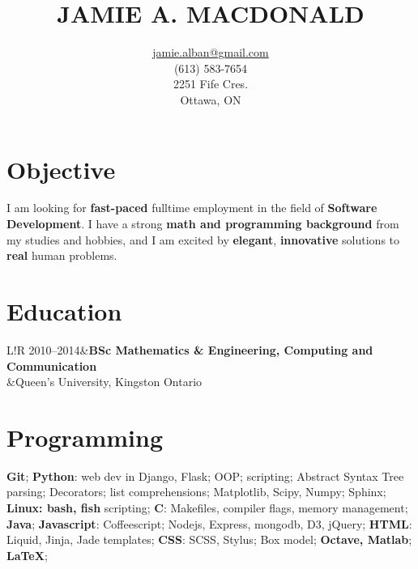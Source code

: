\documentclass[10pt]{article}
\title{JAMIE A. MACDONALD}
\author{\href{mailto:jamie.alban@gmail.com}{jamie.alban@gmail.com}\\(613) 583-7654\\2251 Fife Cres.\\Ottawa, ON}
\date{}
\newcommand\VRule{\color{lightgray}\vrule width 0.5pt}
\begin{document}
\begin{minipage}{0.2\textwidth}
\hspace{0em}
\end{minipage}
\begin{minipage}{0.55\textwidth}
\vspace{-3em}
\maketitle
\end{minipage}
\begin{minipage}{0.25\textwidth}
\end{minipage}
\thispagestyle{fancy}
\vspace{-3em}
\section*{Objective}
I am looking for \textbf{fast-paced} fulltime employment in the field of \textbf{Software Development}. I have a strong \textbf{math and programming background} from my studies and hobbies, and I am excited by \textbf{elegant}, \textbf{innovative} solutions to \textbf{real} human problems.
\vspace{-1em}
\section*{Education}
\begin{tabular}{L!{\VRule}R}
2010--2014&{\bf BSc Mathematics \& Engineering, Computing and Communication}\\
          &{Queen's University, Kingston Ontario}\\
\end{tabular}
\vspace{-1em}
\section*{Programming}
\textbf{Git}; \textbf{Python}: web dev in Django, Flask; OOP; scripting; Abstract Syntax Tree parsing; Decorators; list comprehensions; Matplotlib, Scipy, Numpy; Sphinx; \textbf{Linux: bash, fish} scripting; \textbf{C}: Makefiles, compiler flags, memory management; \textbf{Java}; \textbf{Javascript}: Coffeescript; Nodejs, Express, mongodb, D3, jQuery; \textbf{HTML}: Liquid, Jinja, Jade templates; \textbf{CSS}: SCSS, Stylus; Box model; \textbf{Octave, Matlab}; \textbf{LaTeX};
\end{document}
